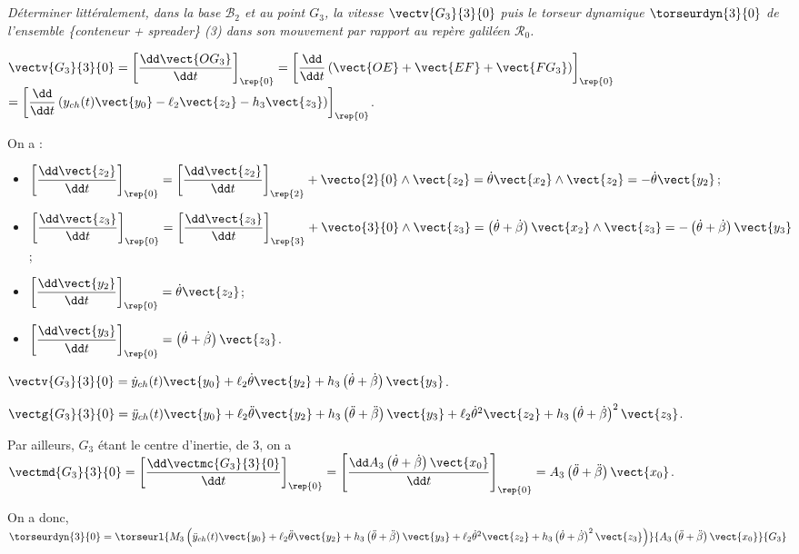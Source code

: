 \documentclass[10pt,fleqn]{article} %
\begin{document}
\subparagraph{}
\textit{Déterminer littéralement, dans la base $\mathcal{B}_2$ et au point $G_3$, la vitesse $\vectv{G_3}{3}{0}$ puis le torseur dynamique $\torseurdyn{3}{0}$ de l’ensemble \{conteneur + spreader\} (3) dans son mouvement par rapport au repère galiléen $\mathcal{R}_0$.}
\ifprof
\begin{corrige}
$\vectv{G_3}{3}{0}=   \left[\dfrac{\dd \vect{OG_3}}{\dd t}\right]_{\rep{0}}=   \left[\dfrac{\dd }{\dd t}\left(
\vect{OE}+\vect{EF}+\vect{FG_3} \right)\right]_{\rep{0}}$ 
$=   \left[\dfrac{\dd }{\dd t}\left(
y_{ch}(t) \vect{y_0}-\ell_2\vect{z_2}-h_3\vect{z_3} \right)\right]_{\rep{0}}$. 

On a : 
\begin{itemize}
\item $ \left[\dfrac{\dd \vect{z_2}}{\dd t}\right]_{\rep{0}}=\left[\dfrac{\dd \vect{z_2}}{\dd t}\right]_{\rep{2}}+\vecto{2}{0} \wedge \vect{z_2}=\dot{\theta} \vect{x_2}\wedge \vect{z_2}=-\dot{\theta} \vect{y_2}$;
\item $ \left[\dfrac{\dd \vect{z_3}}{\dd t}\right]_{\rep{0}}=\left[\dfrac{\dd \vect{z_3}}{\dd t}\right]_{\rep{3}}+\vecto{3}{0} \wedge \vect{z_3}=\left(\dot{\theta}+\dot{\beta}\right) \vect{x_2}\wedge \vect{z_3}=-\left(\dot{\theta}+\dot{\beta}\right) \vect{y_3}$;
\item $ \left[\dfrac{\dd \vect{y_2}}{\dd t}\right]_{\rep{0}}=\dot{\theta} \vect{z_2}$;
\item $ \left[\dfrac{\dd \vect{y_3}}{\dd t}\right]_{\rep{0}}=\left(\dot{\theta}+\dot{\beta}\right) \vect{z_3}$.
\end{itemize}

$\vectv{G_3}{3}{0}=   
\dot{y}_{ch}(t) \vect{y_0}+\ell_2\dot{\theta} \vect{y_2}+h_3\left(\dot{\theta}+\dot{\beta}\right) \vect{y_3}$.

$\vectg{G_3}{3}{0}=   
\ddot{y}_{ch}(t) \vect{y_0}+\ell_2\ddot{\theta} \vect{y_2}+h_3\left(\ddot{\theta}+\ddot{\beta}\right) \vect{y_3}
+   
\ell_2\dot{\theta}^2 \vect{z_2}  +h_3\left(\dot{\theta}+\dot{\beta}\right)^2\vect{z_3} $.

Par ailleurs, $G_3$ étant le centre d'inertie, de 3, on a $\vectmd{G_3}{3}{0}=\left[\dfrac{\dd \vectmc{G_3}{3}{0}}{\dd t}\right]_{\rep{0}}=\left[\dfrac{\dd A_3 \left(\dot{\theta}+\dot{\beta} \right)\vect{x_0}}{\dd t}\right]_{\rep{0}}=A_3 \left(\ddot{\theta}+\ddot{\beta} \right)\vect{x_0}$.

On a donc, $\torseurdyn{3}{0}=\torseurl{M_3\left(\ddot{y}_{ch}(t) \vect{y_0}+\ell_2\ddot{\theta} \vect{y_2}+h_3\left(\ddot{\theta}+\ddot{\beta}\right) \vect{y_3}
+   
\ell_2\dot{\theta}^2 \vect{z_2}  +h_3\left(\dot{\theta}+\dot{\beta}\right)^2\vect{z_3}\right)}{A_3 \left(\ddot{\theta}+\ddot{\beta} \right)\vect{x_0}}{G_3}$
\end{corrige}
\else
\fi
\end{document}
